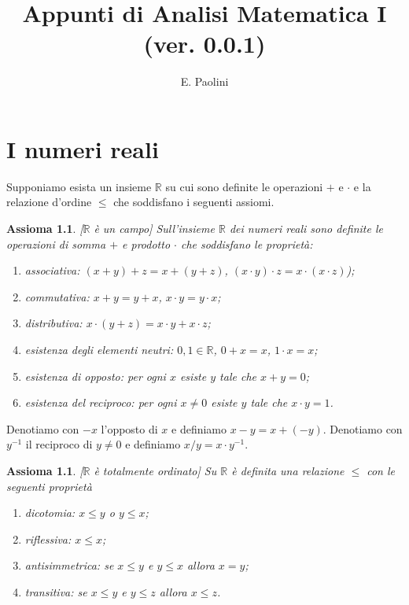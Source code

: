 \documentclass[italian,a4paper,oneside,headinclude]{scrbook}
\title{Appunti di Analisi Matematica I\\(ver. 0.0.1)}
\author{E. Paolini}
\newcommand{\RR}{\mathbb R}
\newtheorem{axiom}[theorem]{Assioma}
\begin{document}
\maketitle


\chapter{I numeri reali}

Supponiamo esista un insieme $\RR$ su cui sono definite le operazioni $+$ e $\cdot$
e la relazione d'ordine $\le$ che soddisfano i seguenti assiomi.

\begin{axiom}\label{axiom_field}[$\RR$ è un campo]
Sull'insieme $\RR$ dei numeri reali sono definite le operazioni di somma $+$ e
prodotto $\cdot$ che soddisfano le proprietà:
\begin{enumerate}
\item associativa: $(x+y)+z = x + (y+z)$, $(x\cdot y)\cdot z = x \cdot (x \cdot z)$);
\item commutativa: $x+y=y+x$, $x\cdot y = y \cdot x$;
\item distributiva: $x\cdot (y+z) = x\cdot y + x \cdot z$;
\item esistenza degli elementi neutri: $0,1\in \RR$, $0+x = x$, $1\cdot x = x$;
\item esistenza di opposto: per ogni $x$ esiste $y$ tale che $x+y = 0$;
\item esistenza del reciproco: per ogni $x\neq 0$ esiste $y$ tale che $x \cdot y = 1$.
\end{enumerate}
\end{axiom}

Denotiamo con $-x$ l'opposto di $x$ e definiamo $x-y = x+(-y)$.
Denotiamo con $y^{-1}$ il reciproco di $y\neq 0$ e
definiamo $x / y = x\cdot y^{-1}$.

\begin{axiom}\label{axiom_order}[$\RR$ è totalmente ordinato]
Su $\RR$ è definita una relazione $\le$ con le seguenti proprietà
\begin{enumerate}
\item dicotomia: $x \le y$ o $y \le x$;
\item riflessiva: $x \le x$;
\item antisimmetrica: se $ x\le y$ e $y \le x$ allora $x=y$;
\item transitiva: se $x\le y $ e $ y \le z$ allora $x\le z$.
\end{enumerate}
\end{axiom}
\end{document}
